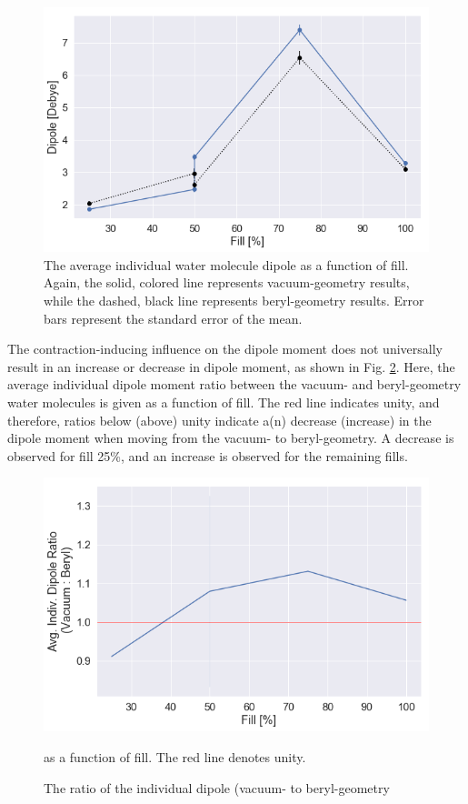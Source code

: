         \begin{figure}
            \centering
            \includegraphics[width=0.9\linewidth]{Figures/System/pc_vacuum_avg_dipole.png}
            \caption{The average individual water molecule dipole as a function of fill. Again, the solid, colored line represents vacuum-geometry results, while the dashed, black line represents beryl-geometry results. Error bars represent the standard error of the mean.}
            \label{fig:pc_vacuum_avg_dipole}
        \end{figure}
        
        The contraction-inducing influence on the dipole moment does not universally result in an increase or decrease in dipole moment, as shown in Fig. \ref{fig:pc_vacuum_dipole_ratios}. Here, the average individual dipole moment ratio between the vacuum- and beryl-geometry water molecules is given as a function of fill. The red line indicates unity, and therefore, ratios below (above) unity indicate a(n) decrease (increase) in the dipole moment when moving from the vacuum- to beryl-geometry. A decrease is observed for fill 25\%, and an increase is observed for the remaining fills. 
        
        \begin{figure}
            \centering
            \includegraphics[width=0.9\linewidth]{Figures/System/pc_vacuum_dipole_ratios.png}
            \caption{The ratio of the individual dipole (vacuum- to beryl-geometry} as a function of fill. The red line denotes unity.
            \label{fig:pc_vacuum_dipole_ratios}
        \end{figure}
        
